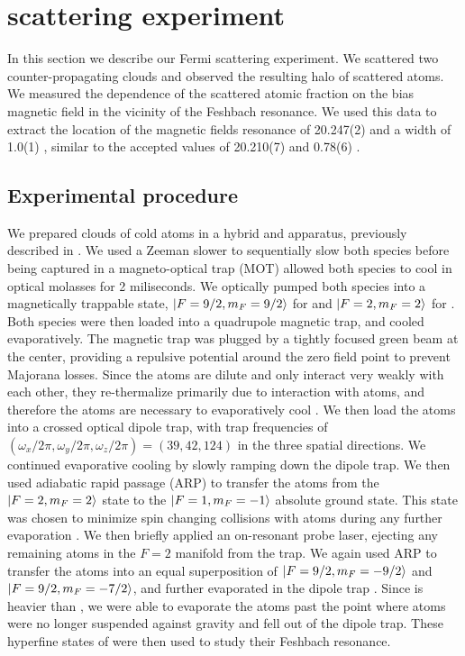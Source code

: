 \documentclass[12pt]{iopart}
\begin{document}
\section{\swave{} scattering experiment}
In this section we describe our Fermi scattering experiment. We scattered two counter-propagating \K{} clouds and observed the resulting \swave{} halo of scattered atoms.  We measured the dependence of the scattered atomic fraction on the bias magnetic field in the vicinity of the Feshbach resonance. We used this data to extract the location of the magnetic fields resonance of 20.247(2)  \mT{} and a width of 1.0(1)  \mT{}, similar to the accepted values of 20.210(7) \mT{} and 0.78(6) \mT{} \cite{Regal04}.
\subsection{Experimental procedure}
We prepared clouds of cold \K{} atoms in a hybrid \K{} and \Rb{} apparatus, previously described in \cite{Williams13, Lin09, KarinaThesis}. We used a Zeeman slower to sequentially slow both species before being captured in a magneto-optical trap (MOT) allowed both species to cool in optical molasses for 2 miliseconds. We optically pumped both species into a magnetically trappable state, $\mathinner{|{F=9/2, m_F=9/2}\rangle}$ for \K{} and $\mathinner{|{F=2,m_F=2}\rangle}$ for \Rb{}. Both species were then loaded into a quadrupole magnetic trap, and cooled evaporatively. The magnetic trap was plugged by a tightly focused green beam at the center, providing a repulsive potential around the zero field point to prevent Majorana losses. Since the \K{} atoms are dilute and only interact very weakly with each other, they re-thermalize primarily due to interaction with \Rb{} atoms, and therefore the \Rb{} atoms are necessary to evaporatively cool \K{}. We then load the atoms into a crossed optical dipole trap, with trap frequencies of $(\omega_x/2\pi,\omega_y/2\pi,\omega_z/2\pi) =(39, 42, 124)$ in the three spatial directions. We continued evaporative cooling by slowly ramping down the dipole trap. We then used adiabatic rapid passage (ARP) to transfer the \Rb{} atoms from the $\mathinner{|{F=2, m_F=2}\rangle}$ state to the  $\mathinner{|{F=1, m_F=-1}\rangle}$ absolute ground state. This state was chosen to minimize spin changing collisions with \K{} atoms during any further evaporation \cite{BestThesis}.  We then briefly applied an on-resonant probe laser, ejecting any remaining \Rb{} atoms in the $F=2$ manifold from the trap. We again used ARP to transfer the \K{} atoms into an equal superposition of $\mathinner{|{F=9/2,m_F=-9/2}\rangle}$ and $\mathinner{|{F=9/2,m_F=-7/2}\rangle}$, and further evaporated in the dipole trap \cite{DeMarco99}. Since \Rb{} is heavier than \K{}, we were able to evaporate the \K{} atoms past the point where \Rb{} atoms were no longer suspended against gravity and fell out of the dipole trap.  These hyperfine states of \K{} were then used to study their Feshbach resonance. 
\end{document}
